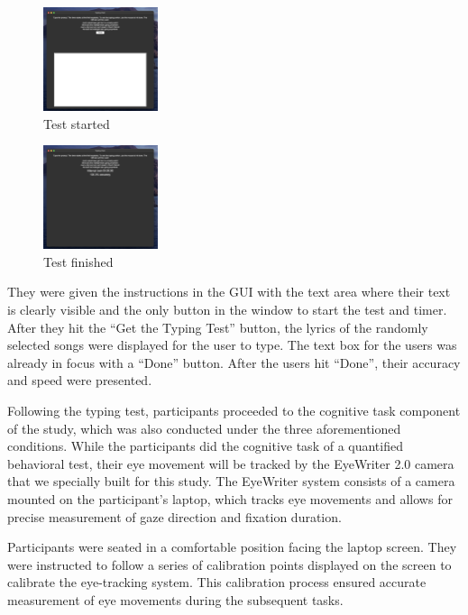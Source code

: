 \documentclass[manuscript, screen, review]{acmart} %
\begin{document}
\begin{figure}
  \includegraphics[width=0.3\textwidth]{typing_test_2}
  \caption{Test started}
\end{figure}

\begin{figure}
  \includegraphics[width=0.3\textwidth]{typing_test_3}
  \caption{Test finished}
\end{figure}

They were given the instructions in the GUI with the text area where their text is clearly visible and the only button in the window to start the test and timer. After they hit the ``Get the Typing Test'' button, the lyrics of the randomly selected songs were displayed for the user to type. The text box for the users was already in focus with a ``Done'' button. After the users hit ``Done'', their accuracy and speed were presented.

Following the typing test, participants proceeded to the cognitive task component of the study, which was also conducted under the three aforementioned conditions. While the participants did the cognitive task of a quantified behavioral test, their eye movement will be tracked by the EyeWriter 2.0 camera that we specially built for this study. The EyeWriter system consists of a camera mounted on the participant's laptop, which tracks eye movements and allows for precise measurement of gaze direction and fixation duration.

Participants were seated in a comfortable position facing the laptop screen. They were instructed to follow a series of calibration points displayed on the screen to calibrate the eye-tracking system. This calibration process ensured accurate measurement of eye movements during the subsequent tasks.
\end{document}
